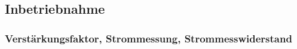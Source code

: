 %



%
%
\subsection{Inbetriebnahme}

\subsubsection{Verstärkungsfaktor, Strommessung, Strommesswiderstand}\label{Appendix:Shunt}

